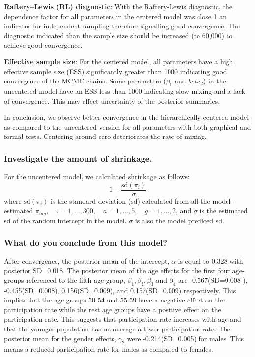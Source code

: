 \documentclass[12pt]{article}
\begin{document}
\textbf{Raftery–Lewis (RL) diagnostic}: With the  Raftery-Lewis diagnostic, the dependence factor for all parameters in the centered model was close 1 an indicator for independent sampling therefore signalling good convergence. The diagnostic indicated than the sample size should be increased (to 60,000) to achieve good convergence. 

\textbf{Effective sample size}: For the centered model, all parameters have a high effective sample size (ESS) significantly greater than 1000 indicating good convergence of the MCMC chains. Some parameters ($\beta_1$ and $beta_2$) in the uncentered model have an ESS less than 1000 indicating slow mixing and a lack of convergence. This may affect uncertainty of the posterior summaries. 


In conclusion, we observe better convergence in the hierarchically-centered model as compared to the uncentered version for all parameters with both  graphical and formal tests. Centering around zero deteriorates the rate of mixing. %

\subsubsection{Investigate the amount of shrinkage.}

For the uncentered model, we calculated shrinkage as follows: 
$$1 - \frac{\text{sd}(\pi_i)}{\sigma}$$
where $\mathrm{sd}(\pi_i)$ is the standard deviation (sd) calculated from all the model-estimated $\pi_{iag}, \quad i = 1, \dots, 300, \quad a = 1, \dots, 5, \quad g = 1, \dots, 2$, and  $\sigma$ is the estimated sd of the random intercept in the model. $\sigma$ is also the model prediced sd. 







\subsubsection{What do you conclude from this model?}

After convergence, the posterior mean of the intercept, $\alpha$ is equal to 0.328 with posterior SD=0.018. The posterior mean of the age effects for the first four age-groups referenced to the fifth age-group, $\beta_1, \beta_2, \beta_3$ and $\beta_4$ are -0.567(SD=0.008 ), -0.455(SD=0.008), 0.156(SD=0.009), and 0.157(SD=0.009) respectively. This implies that the age groups 50-54 and 55-59 have a negative effect on the participation rate while the rest age groups have a positive effect on the participation rate. This suggests that participation rate increases with age and that the younger population has on average a lower participation rate. The posterior mean for the gender effects, $\gamma_2$ were -0.214(SD=0.005) for males. This means a reduced participation rate for males as compared to females.   
\end{document}
